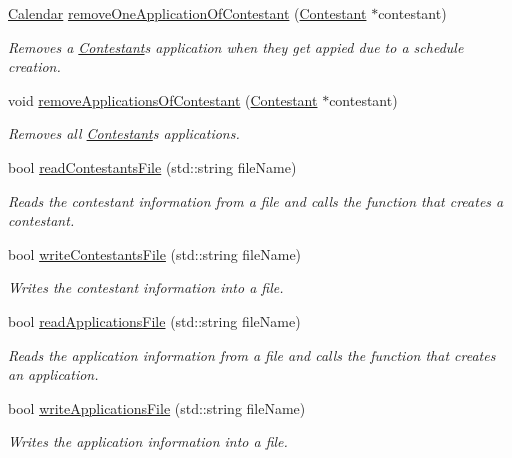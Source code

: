 \begin{DoxyCompactItemize}
\hyperlink{class_calendar}{Calendar} \hyperlink{class_company_a744e01f3f6644035f054ceb6827ddaa9}{remove\+One\+Application\+Of\+Contestant} (\hyperlink{class_contestant}{Contestant} $\ast$contestant)
\begin{DoxyCompactList}\small\item\em Removes a \hyperlink{class_contestant}{Contestant}\textquotesingle{}s application when they get appied due to a schedule creation. \end{DoxyCompactList}\item 
void \hyperlink{class_company_a60f441b02e7db24f47b82e4dcd1a1e17}{remove\+Applications\+Of\+Contestant} (\hyperlink{class_contestant}{Contestant} $\ast$contestant)
\begin{DoxyCompactList}\small\item\em Removes all \hyperlink{class_contestant}{Contestant}\textquotesingle{}s applications. \end{DoxyCompactList}\item 
bool \hyperlink{class_company_af5f148bc24f2d7d74f2c4ada055bad64}{read\+Contestants\+File} (std\+::string file\+Name)
\begin{DoxyCompactList}\small\item\em Reads the contestant information from a file and calls the function that creates a contestant. \end{DoxyCompactList}\item 
bool \hyperlink{class_company_aa52ac354a5ab3f0e5bc0712bb48cb7b4}{write\+Contestants\+File} (std\+::string file\+Name)
\begin{DoxyCompactList}\small\item\em Writes the contestant information into a file. \end{DoxyCompactList}\item 
bool \hyperlink{class_company_a2be6170874e4695402614a5d8f624f9c}{read\+Applications\+File} (std\+::string file\+Name)
\begin{DoxyCompactList}\small\item\em Reads the application information from a file and calls the function that creates an application. \end{DoxyCompactList}\item 
bool \hyperlink{class_company_a4bdd95cb403430ae299259ac26721dde}{write\+Applications\+File} (std\+::string file\+Name)
\begin{DoxyCompactList}\small\item\em Writes the application information into a file. \end{DoxyCompactList}\item 

\end{DoxyCompactItemize}
